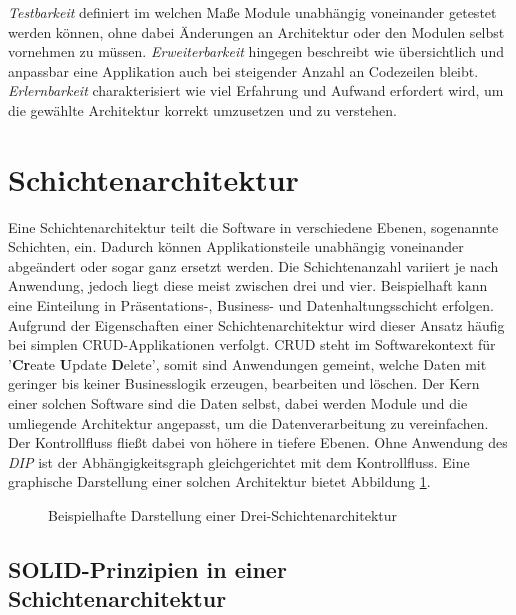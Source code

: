 \documentclass[conference]{IEEEtran}
\begin{document}
\emph{Testbarkeit} definiert im welchen Maße Module unabhängig voneinander getestet werden können, ohne dabei Änderungen an Architektur oder den Modulen selbst vornehmen zu müssen. \emph{Erweiterbarkeit} hingegen beschreibt wie übersichtlich und anpassbar eine Applikation auch bei steigender Anzahl an Codezeilen bleibt. \emph{Erlernbarkeit} charakterisiert wie viel Erfahrung und Aufwand erfordert wird, um die gewählte Architektur korrekt umzusetzen und zu verstehen.





\section{Schichtenarchitektur}

Eine Schichtenarchitektur teilt die Software in verschiedene Ebenen, sogenannte Schichten, ein. Dadurch können Applikationsteile unabhängig voneinander abgeändert oder sogar ganz ersetzt werden. Die Schichtenanzahl variiert je nach Anwendung, jedoch liegt diese meist zwischen drei und vier. Beispielhaft kann eine Einteilung in Präsentations-, Business- und Datenhaltungsschicht erfolgen. Aufgrund der Eigenschaften einer Schichtenarchitektur wird dieser Ansatz häufig bei simplen CRUD-Applikationen verfolgt. CRUD steht im Softwarekontext für '\textbf{Cr}eate \textbf{U}pdate \textbf{D}elete', somit sind Anwendungen gemeint, welche Daten mit geringer bis keiner Businesslogik erzeugen, bearbeiten und löschen. Der Kern einer solchen Software sind die Daten selbst, dabei werden Module und die umliegende Architektur angepasst, um die Datenverarbeitung zu vereinfachen. Der Kontrollfluss fließt dabei von höhere in tiefere Ebenen. Ohne Anwendung des \emph{DIP} ist der Abhängigkeitsgraph gleichgerichtet mit dem Kontrollfluss. Eine graphische Darstellung einer solchen Architektur bietet Abbildung \ref{fig:Schichtenarchitektur}. \cite{Buschmann.2013} \cite{layer.solid}


\begin{figure}[htbp]
	\small
	
	\caption{Beispielhafte Darstellung einer Drei-Schichtenarchitektur}
	\label{fig:Schichtenarchitektur}
\end{figure}


\subsection{SOLID-Prinzipien in einer Schichtenarchitektur}
\end{document}
